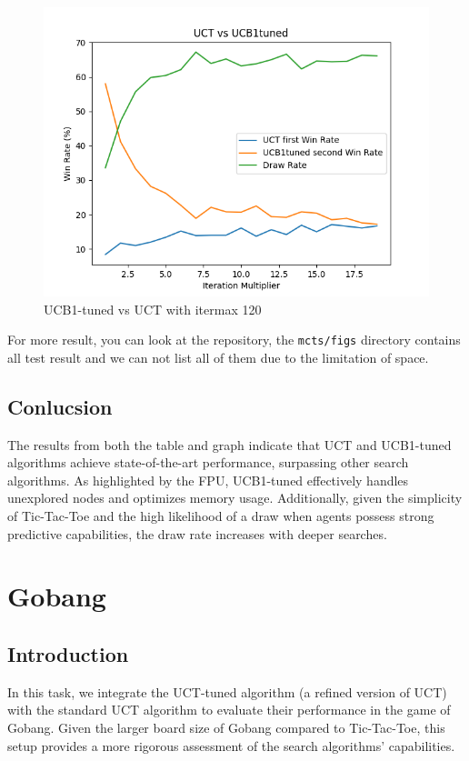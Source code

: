 \documentclass[11pt]{article}
\theoremstyle{definitionstyle}
\begin{document}
\begin{figure}[H]
\begin{minipage}{0.32\textwidth}
        \includegraphics[width=\textwidth]{mcts/figs/120/UCT vs UCB1tuned1.png}
        \caption{UCB1-tuned vs UCT with itermax 120}
        \label{fig:1202}
    \end{minipage}
\end{figure}
For more result, you can look at the repository, the \texttt{mcts/figs} directory contains all test result and we can not list all of them due to the limitation of space.
\subsection{Conlucsion}
The results from both the table and graph indicate that UCT and UCB1-tuned algorithms achieve state-of-the-art performance, surpassing other search algorithms. As highlighted by the FPU, UCB1-tuned effectively handles unexplored nodes and optimizes memory usage. Additionally, given the simplicity of Tic-Tac-Toe and the high likelihood of a draw when agents possess strong predictive capabilities, the draw rate increases with deeper searches.
\section{Gobang}
\subsection{Introduction}
In this task, we integrate the UCT-tuned algorithm (a refined version of UCT) with the standard UCT algorithm to evaluate their performance in the game of Gobang. Given the larger board size of Gobang compared to Tic-Tac-Toe, this setup provides a more rigorous assessment of the search algorithms' capabilities.
\end{document}
